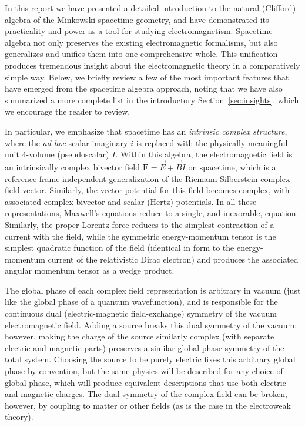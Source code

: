\documentclass[1p,sort&compress]{elsarticle}
\numberwithin{equation}{section}
\newcommand{\rv}[1]{\vec{#1}}
\newcommand{\bv}[1]{\mathbf{#1}}
\begin{document}

In this report we have presented a detailed introduction to the natural (Clifford) algebra of the Minkowski spacetime geometry, and have demonstrated its practicality and power as a tool for studying electromagnetism.  Spacetime algebra not only preserves the existing electromagnetic formalisms, but also generalizes and unifies them into one comprehensive whole.  This unification produces tremendous insight about the electromagnetic theory in a comparatively simple way.  Below, we briefly review a few of the most important features that have emerged from the spacetime algebra approach, noting that we have also summarized a more complete list in the introductory Section~\ref{sec:insights}, which we encourage the reader to review.

In particular, we emphasize that spacetime has an \emph{intrinsic complex structure}, where the \emph{ad hoc} scalar imaginary $i$ is replaced with the physically meaningful unit 4-volume (pseudoscalar) $I$.  Within this algebra, the electromagnetic field is an intrinsically complex bivector field $\bv{F} = \rv{E} + \rv{B}I$ on spacetime, which is a reference-frame-independent generalization of the Riemann-Silberstein complex field vector.  Similarly, the vector potential for this field becomes complex, with associated complex bivector and scalar (Hertz) potentials.  In all these representations, Maxwell's equations reduce to a single, and inexorable, equation.  Similarly, the proper Lorentz force reduces to the simplest contraction of a current with the field, while the symmetric energy-momentum tensor is the simplest quadratic function of the field (identical in form to the energy-momentum current of the relativistic Dirac electron) and produces the associated angular momentum tensor as a wedge product.

The global phase of each complex field representation is arbitrary in vacuum (just like the global phase of a quantum wavefunction), and is responsible for the continuous dual (electric-magnetic field-exchange) symmetry of the vacuum electromagnetic field.  Adding a source breaks this dual symmetry of the vacuum; however, making the charge of the source similarly complex (with separate electric and magnetic parts) preserves a similar global phase symmetry of the total system.  Choosing the source to be purely electric fixes this arbitrary global phase by convention, but the same physics will be described for any choice of global phase, which will produce equivalent descriptions that use both electric and magnetic charges.  The dual symmetry of the complex field can be broken, however, by coupling to matter or other fields (as is the case in the electroweak theory).
\end{document}
